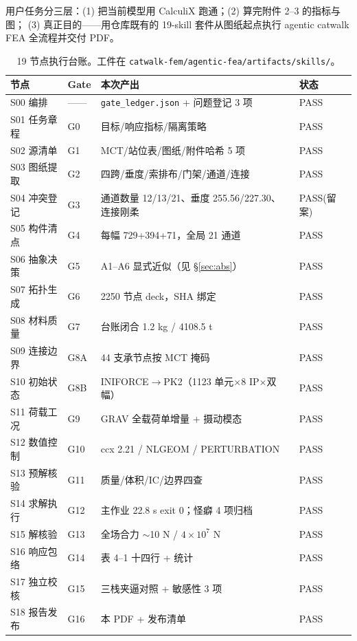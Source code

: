 \documentclass[11pt,a4paper]{ctexart}
\begin{document}
用户任务分三层：(1) 把当前模型用 CalculiX 跑通；(2) 算完附件 2--3 的指标与图；
(3) 真正目的——用仓库既有的 19-skill 套件从图纸起点执行 agentic catwalk FEA 全流程并交付 PDF。

\begin{table}[h]\centering\footnotesize
\begin{tabular}{llll}
\toprule
节点 & Gate & 本次产出 & 状态 \\
\midrule
S00 编排 & —— & \texttt{gate\_ledger.json} + 问题登记 3 项 & PASS \\
S01 任务章程 & G0 & 目标/响应指标/隔离策略 & PASS \\
S02 源清单 & G1 & MCT/站位表/图纸/附件哈希 5 项 & PASS \\
S03 图纸提取 & G2 & 四跨/垂度/索排布/门架/通道/连接 & PASS \\
S04 冲突登记 & G3 & 通道数量 12/13/21、垂度 255.56/227.30、连接刚柔 & PASS(留案) \\
S05 构件清点 & G4 & 每幅 729+394+71，全局 21 通道 & PASS \\
S06 抽象决策 & G5 & A1--A6 显式近似（见 \S\ref{sec:abs}） & PASS \\
S07 拓扑生成 & G6 & 2250 节点 deck，SHA 绑定 & PASS \\
S08 材料质量 & G7 & 台账闭合 1.2 kg / 4108.5 t & PASS \\
S09 连接边界 & G8A & 44 支承节点按 MCT 掩码 & PASS \\
S10 初始状态 & G8B & INIFORCE$\to$PK2（1123 单元$\times$8 IP$\times$双幅） & PASS \\
S11 荷载工况 & G9 & GRAV 全载荷单增量 + 摄动模态 & PASS \\
S12 数值控制 & G10 & ccx 2.21 / NLGEOM / PERTURBATION & PASS \\
S13 预解核验 & G11 & 质量/体积/IC/边界四查 & PASS \\
S14 求解执行 & G12 & 主作业 22.8 s exit 0；怪癖 4 项归档 & PASS \\
S15 解核验 & G13 & 全场合力 $\sim$10 N / $4\times10^7$ N & PASS \\
S16 响应包络 & G14 & 表 4--1 十四行 + 统计 & PASS \\
S17 独立校核 & G15 & 三栈夹逼对照 + 敏感性 3 项 & PASS \\
S18 报告发布 & G16 & 本 PDF + 发布清单 & PASS \\
\bottomrule
\end{tabular}
\caption{19 节点执行台账。工件在 \texttt{catwalk-fem/agentic-fea/artifacts/skills/}。}
\end{table}
\end{document}
